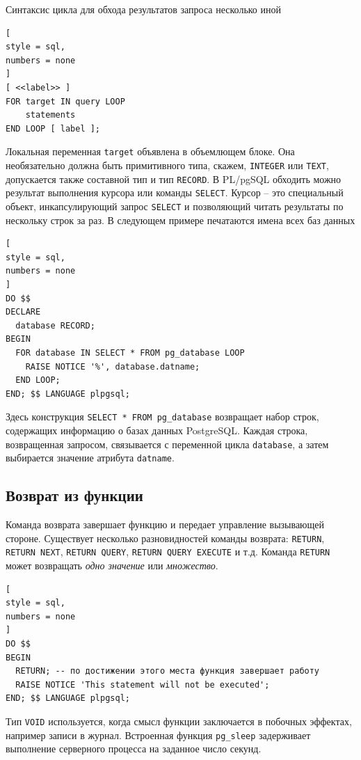 \documentclass[%
	11pt,
	a4paper,
	utf8,
		]{article}
\begin{document}
Синтаксис цикла для обхода результатов запроса несколько иной
\begin{lstlisting}[
style = sql,
numbers = none
]
[ <<label>> ]
FOR target IN query LOOP
    statements
END LOOP [ label ];
\end{lstlisting}

Локальная переменная \texttt{target} объявлена в объемлющем блоке. Она необязательно должна быть примитивного типа, скажем, \texttt{INTEGER} или \texttt{TEXT}, допускается также составной тип и тип \texttt{RECORD}. В PL/pgSQL обходить можно результат выполнения курсора или команды \texttt{SELECT}. Курсор -- это специальный объект, инкапсулирующий запрос \texttt{SELECT} и позволяющий читать результаты по нескольку строк за раз. В следующем примере печатаются имена всех баз данных
\begin{lstlisting}[
style = sql,
numbers = none
]
DO $$
DECLARE
  database RECORD;
BEGIN
  FOR database IN SELECT * FROM pg_database LOOP
    RAISE NOTICE '%', database.datname;
  END LOOP;
END; $$ LANGUAGE plpgsql;
\end{lstlisting}

Здесь конструкция \texttt{SELECT * FROM pg\_database} возвращает набор строк, содержащих информацию о базах данных PostgreSQL. Каждая строка, возвращенная запросом, связывается с переменной цикла \texttt{database}, а затем выбирается значение атрибута \texttt{datname}.

\subsection{Возврат из функции}

Команда возврата завершает функцию и передает управление вызывающей стороне. Существует несколько разновидностей команды возврата: \texttt{RETURN}, \texttt{RETURN NEXT}, \texttt{RETURN QUERY}, \texttt{RETURN QUERY EXECUTE} и т.д. Команда \texttt{RETURN} может возвращать \emph{одно значение} или \emph{множество}.
\begin{lstlisting}[
style = sql,
numbers = none
]
DO $$
BEGIN
  RETURN; -- по достижении этого места функция завершает работу
  RAISE NOTICE 'This statement will not be executed';
END; $$ LANGUAGE plpgsql;
\end{lstlisting}

Тип \texttt{VOID} используется, когда смысл функции заключается в побочных эффектах, например записи в журнал. Встроенная функция \texttt{pg\_sleep} задерживает выполнение серверного процесса на заданное число секунд.
\end{document}
